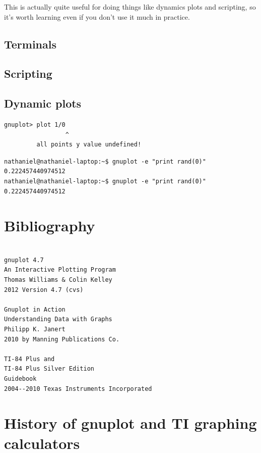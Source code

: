 \documentclass[11pt,letterpaper]{report}
\begin{document}
This is actually quite useful for doing things like dynamics plots and scripting, so it's worth learning even if you don't use it much in practice.



\section{Terminals}

\section{Scripting}

\section{Dynamic plots}

\begin{verbatim}
gnuplot> plot 1/0
                 ^
         all points y value undefined!

\end{verbatim}




\begin{verbatim}
nathaniel@nathaniel-laptop:~$ gnuplot -e "print rand(0)"
0.222457440974512
nathaniel@nathaniel-laptop:~$ gnuplot -e "print rand(0)"
0.222457440974512
\end{verbatim}


\chapter{Bibliography}
\begin{verbatim}

gnuplot 4.7
An Interactive Plotting Program
Thomas Williams & Colin Kelley
2012 Version 4.7 (cvs)

Gnuplot in Action
Understanding Data with Graphs
Philipp K. Janert
2010 by Manning Publications Co.

TI-84 Plus and
TI-84 Plus Silver Edition
Guidebook
2004--2010 Texas Instruments Incorporated

\end{verbatim}

\chapter{History of gnuplot and TI graphing calculators}
\end{document}
